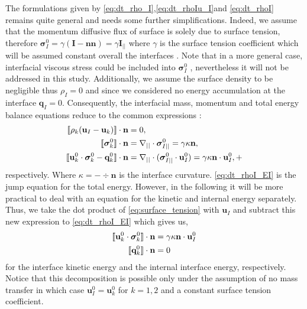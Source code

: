 The formulations given by \ref{eq:dt_rho_I},\ref{eq:dt_rhoIu_I}and \ref{eq:dt_rhoI} remains quite general and needs some further simplifications. 
Indeed, we assume that the momentum diffusive flux of surface is solely due to surface tension, therefore $\bm{\sigma}_I^0  = \gamma (\textbf{I} - \textbf{nn}) = \gamma \textbf{I}_{||}$ where $\gamma$ is the surface tension coefficient which will be assumed constant overall the interfaces \citep[Chapter 2]{tryggvason2011direct}.  
Note that in a more general case, interfacial viscous stress could be included into $\bm{\sigma}_{I}^0$ \citep{brenner2013interfacial,slattery2007interfacial,nadim1996concise}, nevertheless it will not be addressed in this study. 
Additionally, we assume the surface density to be negligible thus $\rho_I = 0$ and since we considered no energy accumulation at the interface $\textbf{q}_I=0$. 
Consequently, the interfacial mass, momentum and total energy balance equations reduce to the common expressions :
\begin{align}
    \label{eq:dt_rho_I}
    \llbracket 
        \rho_k (\textbf{u}_I - \textbf{u}_k)
     \rrbracket \cdot \textbf{n}
    &=0, \\
    \llbracket \bm{\sigma}_k^0 \rrbracket \cdot \textbf{n} 
    &=
    \mathbf{\nabla}_{||}\cdot\bm\sigma^0_{I||}
    =
    \gamma\kappa\textbf{n},
    \label{eq:surface_tension}\\
    \label{eq:dt_rhoI_EI}
    \llbracket \textbf{u}_k^0 \cdot \bm{\sigma}_k^0 - \textbf{q}_k^0 \rrbracket \cdot \textbf{n}
    &=
    \mathbf{\nabla}_{||}\cdot(\bm\sigma^0_{I||}\cdot \textbf{u}_I^0 )
    =
    \gamma\kappa\textbf{n}\cdot \textbf{u}_{I}^0,
    +
\end{align}
respectively. 
Where $\kappa = - \div\textbf{n}$ is the interface curvature.
\ref{eq:dt_rhoI_EI} is the jump equation for the total energy.
However, in the following it will be more practical to deal with an equation for the kinetic and internal energy separately. 
Thus, we take the dot product of \ref{eq:surface_tension} with $\textbf{u}_I$ and subtract this new expression to \ref{eq:dt_rhoI_EI} which gives us, 
\begin{align}
    \label{eq:dt_rhoI_uI2}
    \llbracket \textbf{u}_k^0 \cdot \bm{\sigma}_k^0 \rrbracket \cdot \textbf{n}
    &=
     \gamma\kappa\textbf{n}\cdot \textbf{u}_{I}^0\\
    \label{eq:dt_rhoIe_I}
    \llbracket  \textbf{q}_k^0 \rrbracket \cdot \textbf{n}
    &= 
     0
\end{align}
for the interface kinetic energy and the internal interface energy, respectively. 
Notice that this decomposition is possible only under the assumption of no mass transfer in which case $\textbf{u}_I^0=\textbf{u}_k^0$ for $k =1,2$ and a constant surface tension coefficient.


